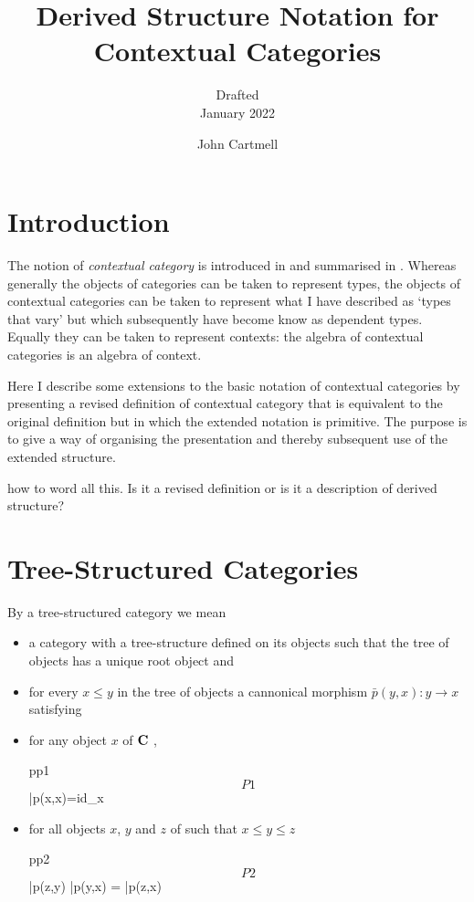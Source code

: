 \documentclass[10pt,a4paper]{scrartcl}
\title{Derived Structure Notation for Contextual Categories}
\subtitle{Drafted \\ January 2022 \\}
\author{John Cartmell}
\date{}
\newcommand{\pbar}{\bar{p}}
\newcommand{\pp}[2]{\pbar(#1,#2)}
\begin{document}
\maketitle


\section{Introduction}
The  notion of \textit{contextual category} is introduced in  \cite{Cartmell78} and summarised in \cite{Cartmell86}. Whereas generally the objects of categories can be taken to represent types, the objects of contextual categories can be taken to represent what I have described as `types that vary' but which subsequently have become know as dependent types. Equally they can be taken to represent contexts: the algebra of contextual categories is an algebra of context.  

Here I describe some extensions to the basic notation of contextual categories by presenting a revised definition of contextual category that is equivalent to the original definition but in which the extended notation is primitive. The purpose is to give a way of organising the presentation and thereby subsequent use of the extended structure.
\iffalse
By extending Voevodsky's `s' operator axiomatisation to fit the new situation I show that the revised definition, as so too the original,  can be represented equationally.
\fi
{} how to word all this. Is it a revised definition or is it a description of derived structure?

\section {Tree-Structured Categories}
\newcommand{\pbartag}[1]{$P#1$}
By a tree-structured category we mean
\begin{itemize}
\item 
a category \catcw with a tree-structure defined on its objects such that the tree of objects has a unique root object and 
\item  for every $x \leq y$ in the tree of objects  a cannonical morphism $\pp{y}{x} :y \rightarrow x$
satisfying
\item for any object $x$ of $\textbf{C}\ $,
\begin{axiomtagged}{pp1}{$\pbartag{1}$}
\pp{x}{x}=id_x
\end{axiomtagged}
\item for all objects $x$, $y$ and $z$ of \catcw such that $x \leq y \leq z$
\begin{axiomtagged}{pp2}{$\pbartag{2}$}
\pp{z}{y} \circ \pp{y}{x} = \pp{z}{x}
\end{axiomtagged}
\end{itemize}
\end{document}

